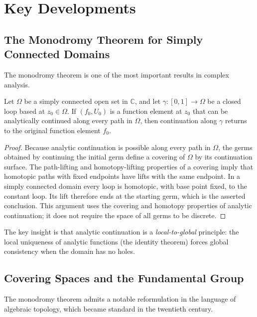 \section{Key Developments}

\subsection{The Monodromy Theorem for Simply Connected Domains}

The monodromy theorem is one of the most important results in complex analysis.

\begin{theorem}
\label{thm:monodromy}
Let $\Omega$ be a simply connected open set in $\mathbb{C}$, and let $\gamma \colon [0,1] \to \Omega$ be a closed loop based at $z_0 \in \Omega$. If $(f_0, U_0)$ is a function element at $z_0$ that can be analytically continued along every path in $\Omega$, then continuation along $\gamma$ returns to the original function element $f_0$.
\end{theorem}

\begin{proof}
Because analytic continuation is possible along every path in $\Omega$, the germs obtained by continuing the initial germ define a covering of $\Omega$ by its continuation surface. The path-lifting and homotopy-lifting properties of a covering imply that homotopic paths with fixed endpoints have lifts with the same endpoint. In a simply connected domain every loop is homotopic, with base point fixed, to the constant loop. Its lift therefore ends at the starting germ, which is the asserted conclusion. This argument uses the covering and homotopy properties of analytic continuation; it does not require the space of all germs to be discrete.
\end{proof}

The key insight is that analytic continuation is a \emph{local-to-global} principle: the local uniqueness of analytic functions (the identity theorem) forces global consistency when the domain has no holes.

\subsection{Covering Spaces and the Fundamental Group}

The monodromy theorem admits a notable reformulation in the language of algebraic topology, which became standard in the twentieth century.

